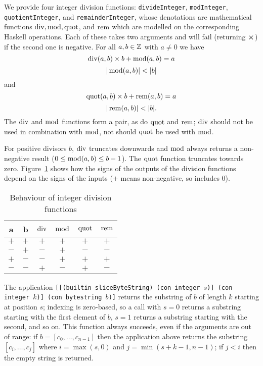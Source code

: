 \label{note:integer-division-functions}
We provide four integer division functions: \texttt{divideInteger},
\texttt{modInteger}, \texttt{quotientInteger}, and \texttt{remainderInteger},
whose denotations are mathematical functions $\operatorname{div}, \operatorname{mod}, \operatorname{quot}$, and
$\operatorname{rem}$ which are modelled on the corresponding Haskell operations. Each of
these takes two arguments and will fail (returning $\errorX$) if the second one
is negative.  For all $a,b \in \mathbb{Z}$ with $a \ne 0$ we have
$$
\operatorname{div}(a,b) \times b + \operatorname{mod}(a,b) = a
$$
$$
  |\operatorname{mod}(a,b)| < |b|
$$\noindent and
$$
  \operatorname{quot}(a,b) \times b + \operatorname{rem}(a,b) = a
$$
$$
  |\operatorname{rem}(a,b)| < |b|.
$$
\noindent The $\operatorname{div}$ and $\operatorname{mod}$ functions form a pair, as do $\operatorname{quot}$ and $\operatorname{rem}$;
$\operatorname{div}$ should not be used in combination with $\operatorname{mod}$, not should $\operatorname{quot}$ be used
with $\operatorname{mod}$.

For positive divisors $b$, $\operatorname{div}$ truncates downwards and $\operatorname{mod}$ always
returns a non-negative result ($0 \leq \operatorname{mod}(a,b) \leq b-1$).  The $\operatorname{quot}$
function truncates towards zero.  Figure~\ref{fig:integer-division-signs} shows
how the signs of the outputs of the division functions depend on the signs of
the inputs ($+$ means non-negative, so includes 0).
\begin{table}[H]
  \centering
    \begin{tabular}{|cc|cc|cc|}
        \hline
        a & b & $\operatorname{div}$ & $\operatorname{mod}$ & $\operatorname{quot}$ & $\operatorname{rem}$ \\
        \hline
        $+$ & $+$ & $+$ & $+$ & $+$ & $+$ \\
        $-$ & $+$ & $-$ & $+$ & $-$ & $-$ \\
        $+$ & $-$ & $-$ & $+$ & $+$ & $+$ \\
        $-$ & $-$ & $+$ & $-$ & $+$ & $-$ \\
        \hline
        \end{tabular}
   \caption{Behaviour of integer division functions}
   \label{fig:integer-division-signs}
\end{table}

\label{note:slicebytestring}
The application \texttt{[[(builtin sliceByteString) (con integer $s$)] (con
    integer $k$)] (con bytestring $b$)]} returns the substring of $b$ of length
$k$ starting at position $s$; indexing is zero-based, so a call with $s=0$
returns a substring starting with the first element of $b$, $s=1$ returns a
substring starting with the second, and so on.  This function always succeeds,
even if the arguments are out of range: if $b=[c_0, \ldots, c_{n-1}]$ then the
  application above returns the substring $[c_i, \ldots, c_j]$ where
  $i=\max(s,0)$ and $j=\min(s+k-1, n-1)$; if $j<i$ then the empty string is returned.
  

